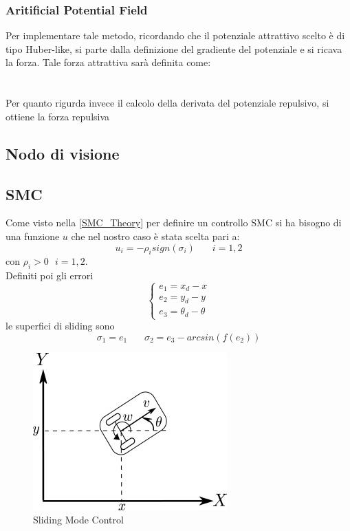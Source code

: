 \subsubsection{Aritificial Potential Field}
Per implementare tale metodo, ricordando che il potenziale attrattivo scelto è di tipo Huber-like, si parte dalla definizione del gradiente del potenziale e si ricava la forza. Tale forza attrattiva sarà definita come:\\ \\ \\Per quanto rigurda invece il calcolo della derivata del potenziale repulsivo, si ottiene la forza repulsiva 


\subsection{Nodo di visione}
\subsection{SMC}
Come visto nella \autoref{SMC_Theory} per definire un controllo SMC si ha bisogno di una funzione $u$ che nel nostro caso è stata scelta pari a: 
\begin{equation}
        u_i=-\rho_{i}sign(\sigma_i)\: \: \: \: \: \: \: \:i=1,2
\end{equation}
con $\rho_i>0 \: \: \:i=1,2$. \\
Definiti poi gli errori 
\begin{equation}
\begin{cases}
    e_1=x_d-x 
   \\
   e_2=y_d-y
   \\
   e_3=\theta_d-\theta
\end{cases} 
\end{equation}
le superfici di sliding sono
\begin{equation}
       \sigma_1=e_1 \ \ \ \ \ \ \ \ \sigma_2=e_3-arcsin(f(e_2))
\end{equation} 
\begin{figure} [H]
    \centering
    \includegraphics[width=0.5\linewidth]{img/SMC.jpg}
    \caption{Sliding Mode Control}
    \label{fig:SMC}
\end{figure}

